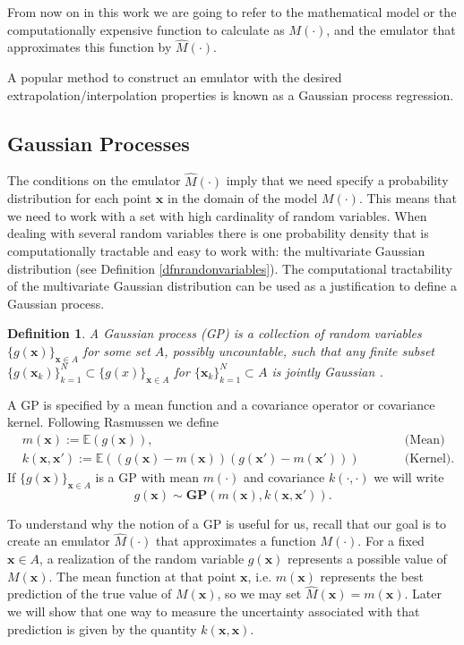 \documentclass[12pt]{book}
\newtheorem{definition}{Definition}
\newcommand{\E}{\mathbb{E}} %
\newcommand{\x}{\textbf{x}}
\begin{document}
From now on in this work we are going to refer to the mathematical model or the computationally expensive
function to calculate as $M(\cdot)$, and the emulator that approximates this function  by 
$\widehat{M}(\cdot)$.

A  popular  method to construct an emulator with the desired
extrapolation/interpolation properties is  known as a Gaussian process regression.  

\subsection{Gaussian Processes}\label{secGPs}
The conditions on the emulator $\widehat{M}(\cdot)$ imply that we need
specify a probability distribution for each point $\textbf{x}$ in the domain of the model $M(\cdot)$.
This means that  we need to work with 
 a set with high cardinality of random variables. 
When dealing with 
several random variables there is one probability density that is computationally tractable and
easy to work with: the multivariate Gaussian distribution (see Definition \ref{dfnrandonvariables}). 
The computational tractability  of the multivariate Gaussian distribution can be used as a justification
to define a Gaussian process.
\begin{definition}\label{dfnGP}
A Gaussian process (GP) is a collection of random variables $\{g(\x)\}_{\x\in A}$ for some set $A$, 
possibly uncountable,
 such that any finite subset
 $\{g(\x_{k})\}_{k=1}^{N}\subset\{g(x)\}_{\x\in A}$ for 
$\{\x_{k}\}_{k=1}^{N}\subset A$ is jointly Gaussian
\cite{rasmussen2006gaussian}. 
\end{definition}

A GP is specified by a mean function and a covariance operator or covariance kernel. 
Following  Rasmussen \cite{rasmussen2006gaussian} we define
\begin{align*}
& m(\x):=\E(g(\x)),&&\qquad\text{(Mean)}\\
& k(\x,\x'):=\E((g(\x)-m(\x))(g(\x')-m(\x')))&&\qquad\text{(Kernel)}.
\end{align*}
If $\{g(\x)\}_{\x\in A}$ is a GP with mean $m(\cdot)$ and covariance $k(\cdot,\cdot)$ we will write
\begin{equation*}
g(\x)\sim \textbf{GP}(m(\x),k(\x,\x')).
\end{equation*} 

To  understand why the notion of a GP is useful for us, recall that our goal is to create
an emulator $\widehat{M}(\cdot)$ that approximates a function $M(\cdot)$. 
For a fixed $\x\in A$, a realization of the  random variable $g(\x)$ represents
a possible value of $M(\x)$. The mean function at that point $\x$, i.e. $m(\x)$ 
represents the best prediction of the true value of $M(\x)$, so we may set
$\widehat{M}(\x)=m(\x)$. Later we will show that one way to measure the  uncertainty 
associated with that prediction is given by the quantity $k(\x,\x)$.
\end{document}
